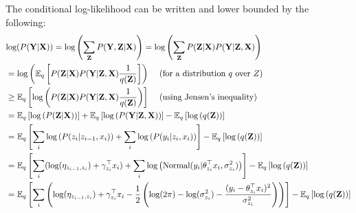 \documentclass[12pt]{article}
\begin{document}
The conditional log-likelihood can be written and lower bounded by the following:
\begin{equation*}
    \begin{split}
        &\text{log}(P(\textbf{Y} | \textbf{X})) = \text{log} \left( \sum_{\textbf{Z}} P(\textbf{Y},\textbf{Z} | \textbf{X}) \right)
             = \text{log} \left( \sum_{\textbf{Z}} P(\textbf{Z} | \textbf{X}) P(\textbf{Y} | \textbf{Z}, \textbf{X}) \right)\\
        & =  \text{log} \left( \mathbb{E}_q \left[ P(\textbf{Z} | \textbf{X}) P(\textbf{Y} | \textbf{Z}, \textbf{X}) \frac{1}{q(\textbf{Z})} \right] \right)
             \text{ \hspace{3mm}(for a distribution $q$ over $Z$)}\\
        & \geq  \mathbb{E}_q \left[  \text{log} \left( P(\textbf{Z} | \textbf{X}) P(\textbf{Y} | \textbf{Z}, \textbf{X}) 
            \frac{1}{q(\textbf{Z})} \right) \right]
             \text{ \hspace{3mm}(using Jensen's inequality)}\\
        & = \mathbb{E}_q \left[ \text{log} \left( P(\textbf{Z} | \textbf{X}) \right) \right] 
             + \mathbb{E}_q \left[\text{log} \left( P(\textbf{Y} | \textbf{Z}, \textbf{X}) \right) \right] 
             - \mathbb{E}_q \left[\text{log} \left( q(\textbf{Z}) \right) \right] \\
        & = \mathbb{E}_q \left[ \sum_i \text{log} \left( P(z_i | z_{i-1}, x_i) \right)
             + \sum_i \text{log} \left( P(y_i | z_i, x_i) \right) \right] 
             - \mathbb{E}_q \left[\text{log} \left( q(\textbf{Z}) \right) \right] \\
        & = \mathbb{E}_q \left[ \sum_i (\text{log}(\eta_{z_{i-1},z_i}) + \gamma_{z_i}^{\top} x_i )
             + \sum_i \text{log} \left( \text{Normal}(y_i | \theta_{z_i}^{\top} x_i, \sigma_{z_i}^2) \right) \right] 
             - \mathbb{E}_q \left[\text{log} \left( q(\textbf{Z}) \right) \right] \\
        & = \mathbb{E}_q \left[ \sum_i \left( \text{log}(\eta_{z_{i-1},z_i}) + \gamma_{z_i}^{\top} x_i 
             -\frac{1}{2}\left( \text{log}(2\pi) - \text{log}(\sigma_{z_i}^2) - \frac{(y_i - \theta_{z_i}^{\top} x_i)^2}{ \sigma_{z_i}^2} \right)  \right) \right]
             - \mathbb{E}_q \left[\text{log} \left( q(\textbf{Z}) \right) \right] \\

\end{split}
\end{equation*}
\end{document}
